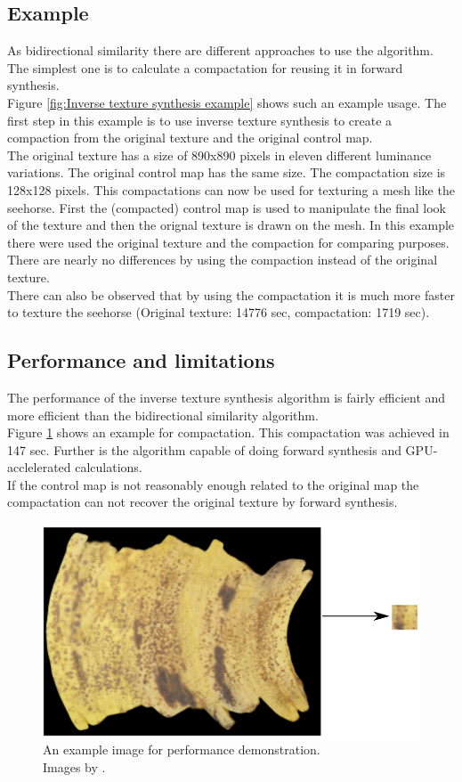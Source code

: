 \subsection{Example}
As bidirectional similarity there are different approaches to use the algorithm. The simplest one is to calculate a compactation for reusing it in forward synthesis.\\
Figure \ref{fig:Inverse texture synthesis example} shows such an example usage. The first step in this example is to use inverse texture synthesis to create a compaction from the original texture and the original control map.\\
The original texture has a size of 890x890 pixels in eleven different luminance variations. The original control map has the same size. The compactation size is 128x128 pixels. This compactations can now be used for texturing a mesh like the seehorse. First the (compacted) control map is used to manipulate the final look of the texture and then the orignal texture is drawn on the mesh. In this example there were used the original texture and the compaction for comparing purposes. There are nearly no differences by using the compaction instead of the original texture.\\
There can also be observed that by using the compactation it is much more faster to texture the seehorse (Original texture: 14776 sec, compactation: 1719 sec).
\pagebreak

\subsection{Performance and limitations}
The performance of the inverse texture synthesis algorithm is fairly efficient and more efficient than the bidirectional similarity algorithm.\\
Figure \ref{fig:Inverse texture synthesis performance} shows an example for compactation. This compactation was achieved in 147 sec. Further is the algorithm capable of doing forward synthesis and GPU-acclelerated calculations.\\
If the control map is not reasonably enough related to the original map the compactation can not recover the original texture by forward synthesis.

\begin{figure}[h]
\centering
\includegraphics[scale=1]{img/its-banana}
\caption[Inverse texture synthesis performance]{An example image for performance demonstration.\\ Images by \cite{its}.}
\label{fig:Inverse texture synthesis performance}
\end{figure}
